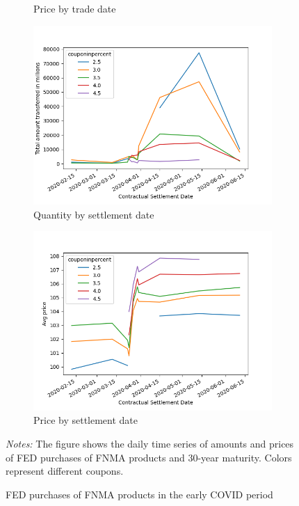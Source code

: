 \documentclass[11pt,a4paper]{article}
\begin{document}
\begin{figure}[h]
\begin{subfigure}[b]{0.49\textwidth}
      \caption{ Price by trade date}
     \end{subfigure}
    \begin{subfigure}[b]{0.49\textwidth}
        \includegraphics[width=0.998\textwidth]{../results/figures/FNMA_daily_purchases_contractualsettlementdate_amount.png}
        \caption{ Quantity by settlement date}
       \end{subfigure}
       \begin{subfigure}[b]{0.49\textwidth}
        \includegraphics[width=0.998\textwidth]{../results/figures/FNMA_daily_purchases_contractualsettlementdate_price.png}
        \caption{ Price by settlement date}
       \end{subfigure}
     \caption{FED purchases of FNMA products in the early COVID period} 
     \begin{minipage}{\textwidth}
        \footnotesize{\textit{Notes:} The figure shows the daily time series of amounts and prices of FED purchases of FNMA products and 30-year maturity. Colors represent different coupons. } 
        \end{minipage}
\end{figure}
\end{document}
